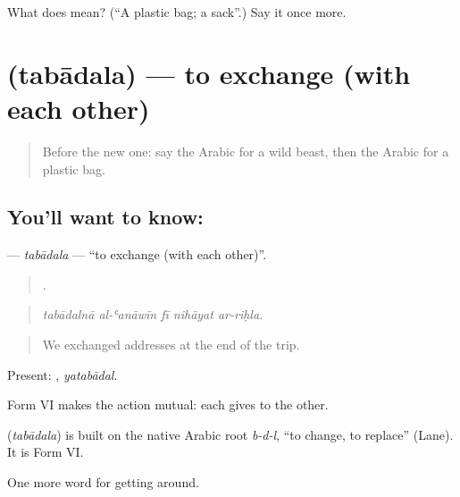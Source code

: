 \begin{tcolorbox}[breakable,colback=teal!4,colframe=teal!35!black,title={Before you move on}]
What does  mean? (\textquotedblleft{}A plastic bag; a sack\textquotedblright{}.) Say it once more.
\end{tcolorbox}
\section[\texorpdfstring{\ar{تبادل} (tabādala)}{تبادل (tabādala)}]{ (tabādala) — to exchange (with each other)}

\label{lesson:AR-C479-tabadala}



\begin{quote}
Before the new one: say the Arabic for a wild beast, then the Arabic for a plastic bag.
\end{quote}

\subsection*{You'll want to know: }
\textbf{} — \emph{tabādala} — \textquotedblleft{}to exchange (with each other)\textquotedblright{}.

\begin{quote}
    .
\end{quote}

\begin{quote}
\emph{tabādalnā al-ʿanāwīn fī nihāyat ar-riḥla.}
\end{quote}

\begin{quote}
We exchanged addresses at the end of the trip.
\end{quote}

Present: , \emph{yatabādal}.

Form VI makes the action mutual: each gives to the other.

\begin{cousinweb}
\textbf{} (\emph{tabādala}) is built on the native Arabic root \emph{b-d-l}, \textquotedblleft{}to change, to replace\textquotedblright{} (Lane). It is Form VI.
\end{cousinweb}

\begin{grammarlens}[title={What you've built}]
One more word for getting around.
\end{grammarlens}

